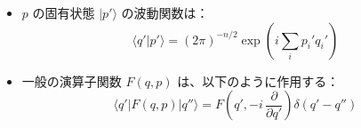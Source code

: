 \documentclass[a4paper,12pt]{article}
\begin{document}
\begin{itemize}
    \item $p$ の固有状態 $|p'\rangle$ の波動関数は：
      \begin{equation*}
      \langle q'|p'\rangle = (2\pi)^{-n/2} \exp\left(i \sum_i p_i' q_i'\right)
      \end{equation*}
    
    \item 一般の演算子関数 $F(q, p)$ は、以下のように作用する：
      \begin{equation*}
      \langle q'|F(q, p)|q''\rangle = F\left(q', -i\, \frac{\partial}{\partial q'}\right) \delta(q' - q'') \tag{1.5}
      \end{equation*}
    
    \end{itemize}
    
\end{document}
